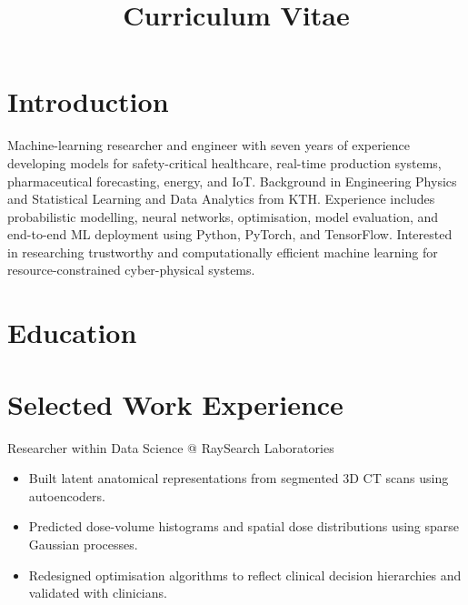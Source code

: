 \documentclass[11pt,a4paper]{moderncv}
\title{Curriculum Vitae}
\begin{document}
\makecvtitle

\section*{Introduction}
Machine-learning researcher and engineer with seven years of experience developing models for safety-critical healthcare, real-time production systems, pharmaceutical forecasting, energy, and IoT. Background in Engineering Physics and Statistical Learning and Data Analytics from KTH. Experience includes probabilistic modelling, neural networks, optimisation, model evaluation, and end-to-end ML deployment using Python, PyTorch, and TensorFlow. Interested in researching trustworthy and computationally efficient machine learning for resource-constrained cyber-physical systems.

\section{Education}



\section{Selected Work Experience}

\large{Researcher within Data Science @ RaySearch Laboratories}
\normalsize
\begin{itemize}
\item Built latent anatomical representations from segmented 3D CT scans using autoencoders.
\item Predicted dose-volume histograms and spatial dose distributions using sparse Gaussian processes.
\item Redesigned optimisation algorithms to reflect clinical decision hierarchies and validated with clinicians.
\end{itemize}
\end{document}
